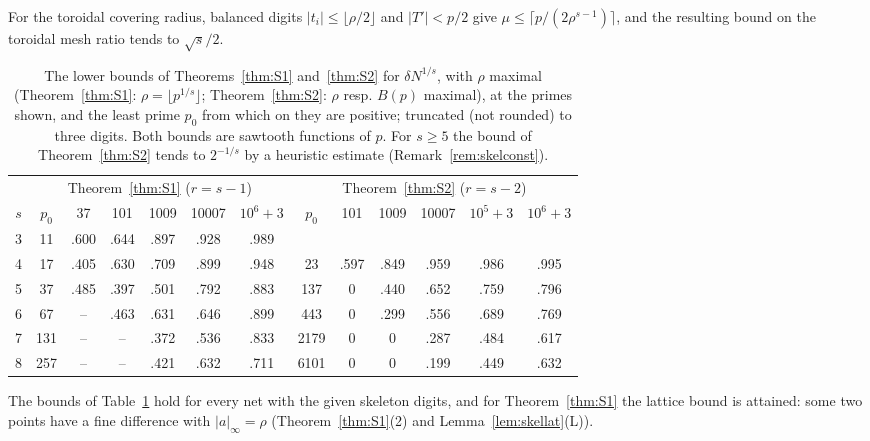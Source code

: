 \documentclass[11pt]{amsart}
\theoremstyle{definition}
\theoremstyle{plain}
\begin{document}
For the toroidal covering radius, balanced digits $|t_i|\le\lfloor\rho/2\rfloor$ and $|T'|<p/2$ give $\mu\le\lceil p/(2\rho^{s-1})\rceil$, and the resulting bound on the toroidal mesh ratio tends to $\sqrt s/2$.



\begin{table}[tbp]
\centering\small\setlength{\tabcolsep}{3.4pt}
\begin{tabular}{@{}ccccccc@{\qquad}cccccc@{}}
\toprule
& \multicolumn{6}{c}{Theorem~\ref{thm:S1} ($r=s-1$)} & \multicolumn{6}{c}{Theorem~\ref{thm:S2} ($r=s-2$)}\\
$s$ & $p_0$ & 37 & 101 & 1009 & 10007 & $10^6{+}3$ & $p_0$ & 101 & 1009 & 10007 & $10^5{+}3$ & $10^6{+}3$\\
\midrule
3 & 11 & .600 & .644 & .897 & .928 & .989 & & & & & & \\
4 & 17 & .405 & .630 & .709 & .899 & .948 & 23 & .597 & .849 & .959 & .986 & .995\\
5 & 37 & .485 & .397 & .501 & .792 & .883 & 137 & 0 & .440 & .652 & .759 & .796\\
6 & 67 & -- & .463 & .631 & .646 & .899 & 443 & 0 & .299 & .556 & .689 & .769\\
7 & 131 & -- & -- & .372 & .536 & .833 & 2179 & 0 & 0 & .287 & .484 & .617\\
8 & 257 & -- & -- & .421 & .632 & .711 & 6101 & 0 & 0 & .199 & .449 & .632\\
\bottomrule
\end{tabular}
\medskip
\caption{The lower bounds of Theorems~\ref{thm:S1} and~\ref{thm:S2} for $\delta N^{1/s}$, with $\rho$ maximal (Theorem~\ref{thm:S1}: $\rho=\lfloor p^{1/s}\rfloor$; Theorem~\ref{thm:S2}: $\rho$ resp. $B(p)$ maximal), at the primes shown, and the least prime $p_0$ from which on they are positive; truncated (not rounded) to three digits. Both bounds are sawtooth functions of $p$. For $s\ge5$ the bound of Theorem~\ref{thm:S2} tends to $2^{-1/s}$ by a heuristic estimate (Remark~\ref{rem:skelconst}).}
\label{tab:skel}
\end{table}

The bounds of Table~\ref{tab:skel} hold for every net with the given skeleton digits, and for Theorem~\ref{thm:S1} the lattice bound is attained: some two points have a fine difference with $|a|_\infty=\rho$ (Theorem~\ref{thm:S1}(2) and Lemma~\ref{lem:skellat}(L)).
\end{document}
